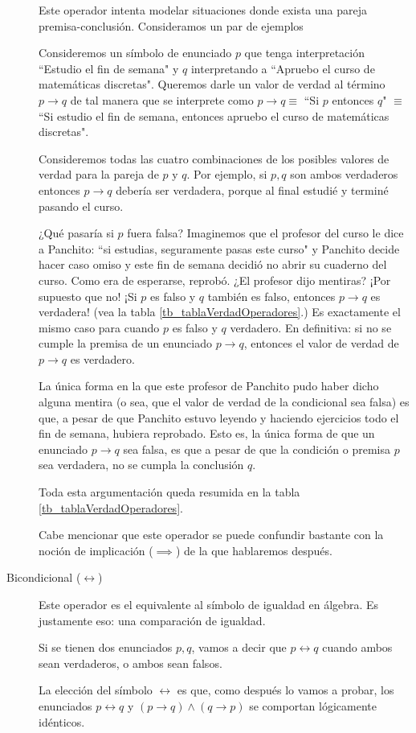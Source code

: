 \documentclass{book}
\theoremstyle{definition}
\begin{document}
\begin{description}
	Este operador intenta modelar situaciones donde exista una pareja premisa-conclusión. Consideramos un par de ejemplos
	
	Consideremos un símbolo de enunciado $p$ que tenga interpretación ``Estudio el fin de semana" y $q$ interpretando a ``Apruebo el curso de matemáticas discretas".
	Queremos darle un valor de verdad al término $p \rightarrow q$ de tal manera que se interprete como $p\rightarrow q \equiv$ ``Si $p$ entonces $q$" $\equiv$ ``Si estudio el fin de semana, entonces apruebo el curso de matemáticas discretas".
	
	Consideremos todas las cuatro combinaciones de los posibles valores de verdad para la pareja de $p$ y $q$.
	Por ejemplo, si $p,q$ son ambos verdaderos entonces $p\rightarrow q$ debería ser verdadera, porque al final estudié y terminé pasando el curso.
	
	¿Qué pasaría si $p$ fuera falsa?
	Imaginemos que el profesor del curso le dice a Panchito: ``si estudias, seguramente pasas este curso" y Panchito decide hacer caso omiso y este fin de semana decidió no abrir su cuaderno del curso. Como era de esperarse, reprobó.
	¿El profesor dijo mentiras? ¡Por supuesto que no! ¡Si $p$ es falso y $q$ también es falso, entonces $p\rightarrow q$ es verdadera! (vea la tabla \ref{tb_tablaVerdadOperadores}.)
	Es exactamente el mismo caso para cuando $p$ es falso y $q$ verdadero.
	En definitiva: si no se cumple la premisa de un enunciado $p\rightarrow q$, entonces el valor de verdad de $p\rightarrow q$ es verdadero.
	
	La única forma en la que este profesor de Panchito pudo haber dicho alguna mentira (o sea, que el valor de verdad de la condicional sea falsa) es que, a pesar de que Panchito estuvo leyendo y haciendo ejercicios todo el fin de semana, hubiera reprobado.
	Esto es, la única forma de que un enunciado $p\rightarrow q$ sea falsa, es que a pesar de que la condición o premisa $p$ sea verdadera, no se cumpla la conclusión $q$.
	
	Toda esta argumentación queda resumida en la tabla \ref{tb_tablaVerdadOperadores}.
	
	Cabe mencionar que este operador se puede confundir bastante con la noción de implicación ($\implies$) de la que hablaremos después.
	
	\item[Bicondicional ($\leftrightarrow$)] Este operador es el equivalente al símbolo de igualdad en álgebra. Es justamente eso: una comparación de igualdad.
	
	Si se tienen dos enunciados $p,q$, vamos a decir que $p\leftrightarrow q$ cuando ambos sean verdaderos, o ambos sean falsos.
	
	La elección del símbolo $\leftrightarrow$ es que, como después lo vamos a probar, los enunciados $p\leftrightarrow q$ y $(p \rightarrow q) \wedge (q \rightarrow p)$ se comportan lógicamente idénticos.
\end{description}
\end{document}

